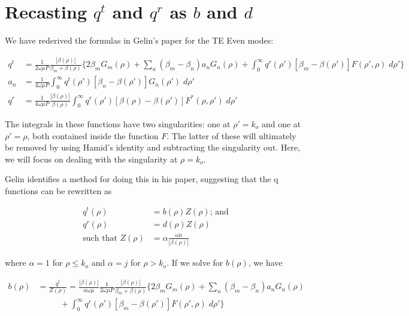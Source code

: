 \documentclass[11pt, oneside]{article}   	%
\begin{document}
\section{Recasting $q^{t}$ and $q^{r}$ as $b$ and $d$}

We have rederived the formulas in Gelin's paper for the TE Even modes:

\begin{align*}
q^{t} &= \frac{1}{2\omega \mu P} \frac{|\beta(\rho)|}{\beta_{m} + \beta(\rho)}  \bigg\{ 2 \beta_{m} G_{m}(\rho) + \sum_{n}(\beta_{m}-\beta_{n}) a_{n} G_{n}(\rho) + \int_{0}^{\infty}q^{r}(\rho')[\beta_{m} - \beta(\rho')] F(\rho',\rho) \; d\rho' \bigg\} \\
a_{n} &= \frac{1}{4 \omega\mu P} \int_{0}^{\infty} q^{t}(\rho') [\beta_{n} - \beta(\rho')] G_{n}(\rho') \; d\rho' \\
q^{r} &= \frac{1}{4\omega \mu P} \frac{|\beta(\rho)|}{\beta(\rho)}  \int_{0}^{\infty}q^{r}(\rho')[\beta(\rho) - \beta(\rho')] F^{*}(\rho,\rho') \; d\rho' 
\end{align*}

\noindent The integrals in these functions have two singularities: one at $\rho' = k_{o}$ and one at $\rho' = \rho$, both contained inside the function $F$. The latter of these will ultimately be removed by using Hamid's identity and subtracting the singularity out. Here, we will focus on dealing with the singularity at $\rho = k_{o}$.

Gelin identifies a method for doing this in his paper, suggesting that the q functions can be rewritten as 

\begin{align*}
q^{t}(\rho) &= b(\rho)Z(\rho) \text{; and}\\
q^{r}(\rho) &= d(\rho)Z(\rho) \\
\text{such that } Z(\rho) &= \alpha \frac{\omega \mu}{|\beta(\rho)|}
\end{align*}

where $\alpha=1$ for $\rho \leq k_{o}$ and $\alpha=j$ for $\rho > k_{o}$. If we solve for $b(\rho)$, we have

\begin{align*}
b(\rho) &= \frac{q^{t}}{Z(\rho)} = \frac{|\beta(\rho)|}{\alpha \omega \mu} \frac{1}{2\omega \mu P} \frac{|\beta(\rho)|}{\beta_{m} + \beta(\rho)}  \bigg\{ 2 \beta_{m} G_{m}(\rho) + \sum_{n}(\beta_{m}-\beta_{n}) a_{n} G_{n}(\rho) \\
&\hspace{32pt} + \int_{0}^{\infty}q^{r}(\rho')[\beta_{m} - \beta(\rho')] F(\rho',\rho) \; d\rho' \bigg\}
\end{align*}
\end{document}
